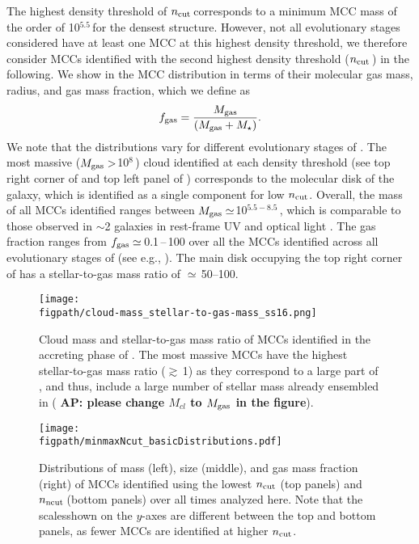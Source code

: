 \IfFileExists{emulateapjlegacy.cls}{\documentclass[iop]{emulateapjlegacy}}{\documentclass[iop]{emulateapj}}
\newcommand{\AP}[1]{({\bf \color{apcolor} AP: #1})}
\def\figpath{./Fig}
\begin{document}
The highest density threshold of $n_{\rm cut}$\,\cc corresponds to a minimum MCC mass of the order of 10$^{5.5}$\,\Msun for the densest structure. However, not all evolutionary stages considered have at least one MCC at this highest density threshold,  we therefore consider MCCs identified with the second highest density threshold ($n_{\rm cut}$\,\cc) in the following. We show in  the MCC distribution in terms of their molecular gas mass, radius, and gas mass fraction, which we define as
\begin{equation}
f_{\rm gas} = \frac{M_{\rm gas}} {\left(M_{\rm gas} + M_\star\right)}.
\end{equation}
%
We note that the distributions vary for different evolutionary stages of \flower.
%
The most massive ($M_{\rm gas}>$10$^8$\,\Msun) cloud identified at each density threshold (see top right corner of  and top left panel of ) corresponds to the molecular disk of the galaxy, which is identified as a single component for low $n_{\rm cut}$. 
%
Overall, the mass of all MCCs identified ranges between $M_{\rm gas}\simeq$10$^{5.5-8.5}$\,\Msun, which is comparable to those observed in \z$\sim$2 galaxies in rest-frame UV and optical light \citep{Elmegreen07a, Elmegreen09a}. The gas fraction ranges from $f_{\rm gas} \simeq$\,0.1\,--\,100 over all the MCCs identified across all evolutionary stages of \flower (see e.g., ). The main disk occupying the top right corner of  has a stellar-to-gas mass ratio of $\simeq$\,50--100.

\begin{figure}
\centering
\texttt{[image: \\figpath/cloud-mass\_stellar-to-gas-mass\_ss16.png]}
\caption{Cloud mass and stellar-to-gas mass ratio of MCCs identified in the accreting phase of \flower.
The most massive MCCs have the highest stellar-to-gas mass ratio ($\gtrsim$\,1) as they correspond to a large part of \flower, and thus, 
include a large number of stellar mass already ensembled in \flower \AP{please change $M_{cl}$ to $M_{\rm gas}$ in the figure}. 
\label{fig:stellarRatio16}}
\end{figure}


\begin{figure*}[htbp]
\centering
\texttt{[image: \\figpath/minmaxNcut\_basicDistributions.pdf]}
\caption{Distributions of mass (left), size (middle), and gas mass
  fraction (right) of MCCs identified using the lowest $n_{\rm cut}$
  (top panels) and $n_{\rm ncut}$\,\cc (bottom panels)
 over all times analyzed here.
Note that the scalesshown on the $y$-axes are different between the top
and bottom panels, as fewer MCCs are identified at higher $n_{\rm
  cut}$. 
\label{fig:dist}}
\end{figure*}
\end{document}
